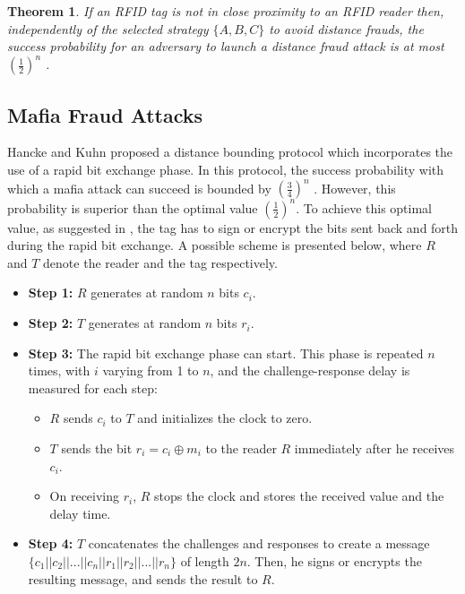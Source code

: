 \documentclass{article}
\newtheorem{theorem}{Theorem}\newtheorem{proposition}[theorem]{Proposition}
\begin{document}
\begin{theorem}\label{th::distance}
If an RFID tag is not in close proximity to an RFID reader then, independently of the selected strategy $\{A, B, C\}$ to avoid distance frauds, the success probability for an adversary to launch a distance fraud attack is at most $(\frac{1}{2})^n$ \cite{brands94}.
\end{theorem}

\subsection{Mafia Fraud Attacks}

Hancke and Kuhn \cite{hancke05}  proposed a distance bounding protocol which incorporates the use of a rapid bit exchange phase. In this protocol, the success probability with which a mafia attack can succeed is bounded by $(\frac{3}{4})^n$ \cite{TuP-2007-rfidtechnology}.  However, this probability is superior than the optimal value $(\frac{1}{2})^n$.   To achieve this optimal value, as suggested in \cite{KimAKSP-2008-icisc,brands94}, the tag has to sign or encrypt the bits sent back and forth during the rapid bit exchange. A possible scheme is presented below, where $R$ and $T$ denote the reader and the tag respectively.
    \begin{itemize}
      \item \textbf{Step 1:} $R$ generates at random $n$ bits $c_i$.
      \item \textbf{Step 2:} $T$ generates at random $n$ bits $r_i$.
       \item \textbf{Step 3:} The rapid bit exchange phase can start. This phase is repeated $n$ times, with $i$ varying from 1 to $n$, and the challenge-response delay is measured for each step:
           \begin{itemize}
             \item $R$  sends $c_i$ to $T$ and initializes the clock to zero.
             \item $T$ sends the bit $r_i = c_i \oplus m_i$  to the reader $R$ immediately after he receives $c_i$.
             \item On receiving $r_i$, $R$ stops the clock and stores the received value and the delay time.
           \end{itemize}
      \item \textbf{Step 4:} $T$ concatenates the challenges and responses to create a message $\{c_1 || c_2 || ... || c_n || r_1 || r_2 || ... || r_n \}$ of length $2n$. Then, he signs or encrypts the resulting message, and sends the result to $R$.
    \end{itemize}
\end{document}
